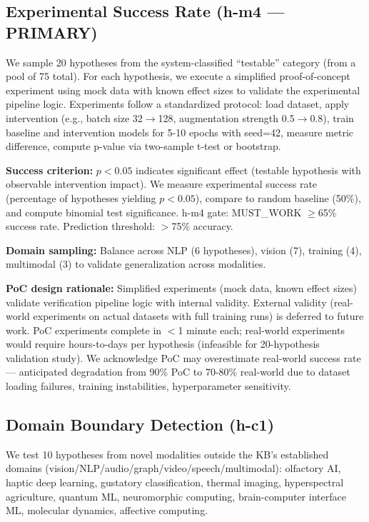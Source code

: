 \subsection{Experimental Success Rate (h-m4 --- PRIMARY)}

We sample 20 hypotheses from the system-classified ``testable'' category (from a pool of 75 total). For each hypothesis, we execute a simplified proof-of-concept experiment using mock data with known effect sizes to validate the experimental pipeline logic. Experiments follow a standardized protocol: load dataset, apply intervention (e.g., batch size 32$\rightarrow$128, augmentation strength 0.5$\rightarrow$0.8), train baseline and intervention models for 5-10 epochs with seed=42, measure metric difference, compute p-value via two-sample t-test or bootstrap.

\textbf{Success criterion:} $p < 0.05$ indicates significant effect (testable hypothesis with observable intervention impact). We measure experimental success rate (percentage of hypotheses yielding $p < 0.05$), compare to random baseline (50\%), and compute binomial test significance. h-m4 gate: MUST\_WORK $\geq$65\% success rate. Prediction threshold: $>$75\% accuracy.

\textbf{Domain sampling:} Balance across NLP (6 hypotheses), vision (7), training (4), multimodal (3) to validate generalization across modalities.

\textbf{PoC design rationale:} Simplified experiments (mock data, known effect sizes) validate verification pipeline logic with internal validity. External validity (real-world experiments on actual datasets with full training runs) is deferred to future work. PoC experiments complete in $<$1 minute each; real-world experiments would require hours-to-days per hypothesis (infeasible for 20-hypothesis validation study). We acknowledge PoC may overestimate real-world success rate --- anticipated degradation from 90\% PoC to 70-80\% real-world due to dataset loading failures, training instabilities, hyperparameter sensitivity.

\subsection{Domain Boundary Detection (h-c1)}

We test 10 hypotheses from novel modalities outside the KB's established domains (vision/NLP/audio/graph/video/speech/multimodal): olfactory AI, haptic deep learning, gustatory classification, thermal imaging, hyperspectral agriculture, quantum ML, neuromorphic computing, brain-computer interface ML, molecular dynamics, affective computing.


